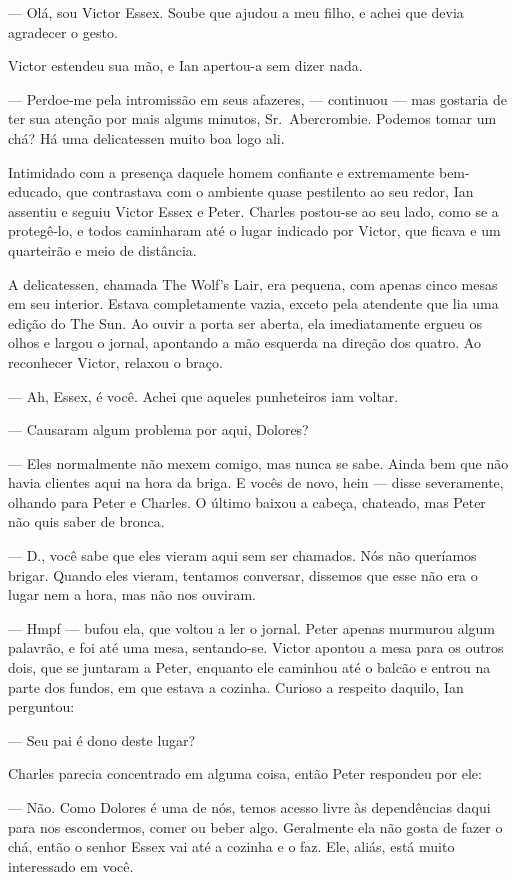 --- Olá, sou Victor Essex. Soube que ajudou a meu filho, e achei que devia
agradecer o gesto.

Victor estendeu sua mão, e Ian apertou-a sem dizer nada.

--- Perdoe-me pela intromissão em seus afazeres, --- continuou --- mas gostaria
de ter sua atenção por mais alguns minutos, Sr.~Abercrombie. Podemos tomar um
chá? Há uma delicatessen muito boa logo ali.

Intimidado com a presença daquele homem confiante e extremamente
bem-edu\-ca\-do, que contrastava com o ambiente quase pestilento ao seu
redor, Ian assentiu e seguiu Victor Essex e Peter. Charles postou-se ao
seu lado, como se a protegê-lo, e todos caminharam até o lugar indicado
por Victor, que ficava e um quarteirão e meio de distância.

A delicatessen, chamada The Wolf’s Lair, era pequena, com apenas cinco mesas em
seu interior. Estava completamente vazia, exceto pela atendente que lia uma
edição do The Sun. Ao ouvir a porta ser aberta, ela imediatamente ergueu os
olhos e largou o jornal, apontando a mão esquerda na direção dos quatro. Ao
reconhecer Victor, relaxou o braço.

--- Ah, Essex, é você. Achei que aqueles punheteiros iam voltar.

--- Causaram algum problema por aqui, Dolores?

--- Eles normalmente não mexem comigo, mas nunca se sabe. Ainda bem que não
havia clientes aqui na hora da briga. E vocês de novo, hein --- disse
severamente, olhando para Peter e Charles. O último baixou a cabeça, chateado,
mas Peter não quis saber de bronca.

--- D., você sabe que eles vieram aqui sem ser chamados. Nós não queríamos
brigar. Quando eles vieram, tentamos conversar, dissemos que esse não era o
lugar nem a hora, mas não nos ouviram.

--- Hmpf --- bufou ela, que voltou a ler o jornal. Peter apenas murmurou algum
palavrão, e foi até uma mesa, sentando-se. Victor apontou a mesa para os outros
dois, que se juntaram a Peter, enquanto ele caminhou até o balcão e entrou na
parte dos fundos, em que estava a cozinha. Curioso a respeito daquilo, Ian
perguntou:

--- Seu pai é dono deste lugar?

Charles parecia concentrado em alguma coisa, então Peter respondeu por ele:

--- Não. Como Dolores é uma de nós, temos acesso livre às dependências daqui
para nos escondermos, comer ou beber algo. Geralmente ela não gosta de fazer o
chá, então o senhor Essex vai até a cozinha e o faz. Ele, aliás, está muito
interessado em você.

